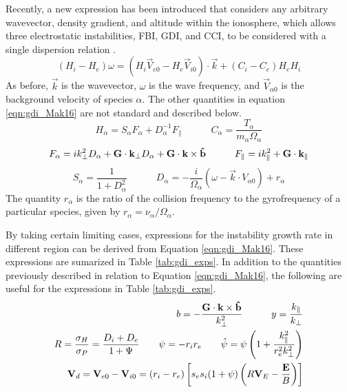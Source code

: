 Recently, a new expression has been introduced that considers any arbitrary wavevector, density gradient, and altitude within the ionosphere, which allows three electrostatic instabilities, FBI, GDI, and CCI, to be considered with a single dispersion relation \citep{Makarevich2016a}.
\begin{equation}
	\label{eqn:gdi_Mak16}
	(H_i-H_e)\omega = (H_i\vec{V}_{e0}-H_e\vec{V}_{i0})\cdot\vec{k}+(C_i-C_e)H_eH_i
\end{equation}
As before, \(\vec{k}\) is the wavevector, \(\omega\) is the wave frequency, and \(\vec{V}_{\alpha 0}\) is the background velocity of species \(\alpha\).  The other quantities in equation \ref{eqn:gdi_Mak16} are not standard and described below.
\begin{equation}
	H_\alpha = S_\alpha F_\alpha + D_\alpha^{-1} F_\parallel \quad\quad\quad 
	C_\alpha = \frac{T_\alpha}{m_\alpha \Omega_\alpha}
\end{equation}
\begin{equation}
	F_\alpha = i k_\perp^2 D_\alpha + \mathbf{G}\cdot\mathbf{k}_\perp D_\alpha + \mathbf{G}\cdot\mathbf{k}\times\mathbf{\hat{b}} \quad\quad\quad
	F_\parallel = i k_\parallel^2 + \mathbf{G}\cdot\mathbf{k}_\parallel
\end{equation}
\begin{equation}
	S_\alpha = \frac{1}{1+D_\alpha^2} \quad\quad\quad
	D_\alpha = -\frac{i}{\Omega_\alpha}(\omega-\vec{k}\cdot{V}_{\alpha 0})+r_\alpha
\end{equation}
The quantity \(r_\alpha\) is the ratio of the collision frequency to the gyrofrequency of a particular species, given by \(r_\alpha = \nu_\alpha/\Omega_\alpha\).  

By taking certain limiting cases, expressions for the instability growth rate in different region can be derived from Equation \ref{eqn:gdi_Mak16}.  These expressions are sumarized in Table \ref{tab:gdi_exps}.  In addition to the quantities previously described in relation to Equation \ref{eqn:gdi_Mak16}, the following are useful for the expressions in Table \ref{tab:gdi_exps}.
\begin{equation}
\begin{split}
	b = -\frac{\mathbf{G}\cdot\mathbf{k}\times\mathbf{\hat{b}}}{k_\perp^2} \quad\quad\quad
	y = \frac{k_\parallel}{k_\perp} \\
	R = \frac{\sigma_H}{\sigma_P} = \frac{D_i+D_e}{1+\Psi} \quad\quad
	\psi = -r_ir_e \quad\quad
	\hat{\psi} = \psi\left(1+\frac{k_\parallel^2}{r_e^2 k_\perp^2}\right) \\
	\mathbf{V}_d = \mathbf{V}_{e0}-\mathbf{V}_{i0} = (r_i-r_e)\left[s_es_i(1+\psi)\left(R\mathbf{V}_E-\frac{\mathbf{E}}{B}\right)\right]
\end{split}
\end{equation}

